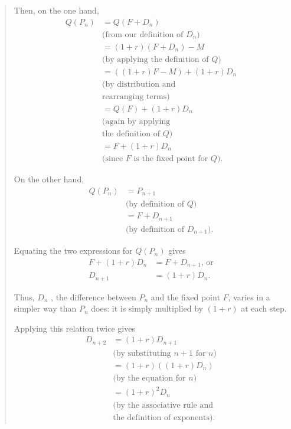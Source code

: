 {\begin{quote}
      Then, on the one hand,
      \begin{align*}
        Q(P_n)
          &=Q(F+D_n) \\
            & \text{(from our definition of $D_n$)} \\
          &=(1+r)(F+D_n)-M \\
            & \text{(by applying the definition of $Q$)} \\
          &=((1 + r)F - M) + (1 + r)D_n \\
            & \text{(by distribution and} \\
            & \text{rearranging terms)} \\
          &=Q(F) + (1 + r)D_n \\
            & \text{(again by applying} \\
            & \text{the definition of $Q$)} \\
          &=F + (1 + r)D_n \\
            & \text{(since $F$ is the fixed point for $Q$).}
      \end{align*}

      On the other hand,
      \begin{align*}
        Q(P_n)
          &=P_{n+1} \\
            & \text{(by definition of $Q$)} \\
          &=F + D_{n+1} \\
            & \text{(by definition of $D_{n+1}$).}
      \end{align*}

      Equating the two expressions for $Q(P_n)$ gives
      \begin{align*}
        F+(1+r)D_n&=F+D_{n+1}, \, \text{or} \\
        D_{n+1}&=(1+r)D_n.
      \end{align*}

      Thus, $D_n$ , the difference between $P_n$ and the fixed point $F$, varies in a simpler way than $P_n$ does: it is simply multiplied by $(1 + r)$ at each step.

      Applying this relation twice gives
      \begin{align*}
        D_{n+2}
          &=(1+r)D_{n+1} \\
            & \text{(by substituting $n + 1$ for $n$)} \\
          &=(1+r)((1+r)D_n) \\
            & \text{(by the equation for $n$)} \\
          &=(1+r)^2D_n \\
            & \text{(by the associative rule and} \\
            & \text{the definition of exponents).}
      \end{align*}


\end{quote}}
